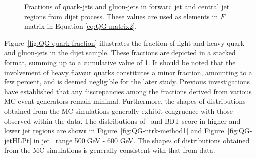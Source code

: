 \begin{figure}[htb]
	\centering
	\quad
	\caption[]{
		Fractions of quark-jets and gluon-jets  %
		in forward jet and central jet regions from {\pythia} dijet process. These values are used as elements in $F$ matrix in Equation \ref{eq:QG-matrix2}. %
		\label{fig:QG-Fmc}
	}
\end{figure}
%


Figure~\ref{fig:QG-quark-fraction} illustrates the fraction of light and heavy quark- and gluon-jets in the  dijet sample. These fractions are depicted in a stacked format, summing up to a cumulative value of 1. It should be noted that the involvement of heavy flavour quarks constitutes a minor fraction, amounting to a few percent, and is deemed negligible for the later study.
Previous investigations~\cite{ref21} have established that any discrepancies among the fractions derived from various MC event generators remain minimal. Furthermore, the shapes of distributions obtained from the MC simulations generally exhibit congruence with those observed within the  data.
The distributions of \ntrk~and BDT score in higher and lower jet regions are shown in Figure~\ref{fig:QG-ntrk-method1} and Figure~\ref{fig:QG-jetHLPt} in jet \pt~range 500 GeV - 600 GeV. The shapes of distributions obtained from the MC simulations is generally consistent with that from data.

